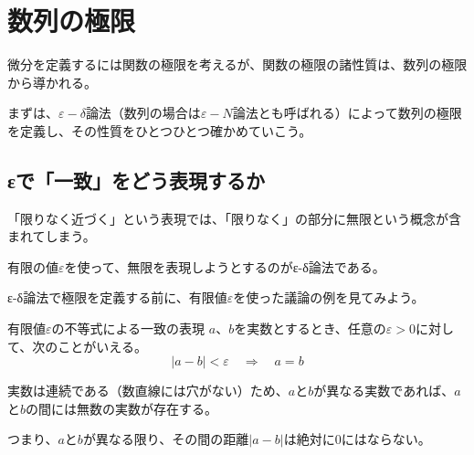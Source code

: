 \documentclass[../../imaging-math]{subfiles}
\begin{document}
\section{数列の極限}

微分を定義するには関数の極限を考えるが、関数の極限の諸性質は、数列の極限から導かれる。

まずは、$\varepsilon - \delta $論法（数列の場合は$\varepsilon - N$論法とも呼ばれる）によって数列の極限を定義し、その性質をひとつひとつ確かめていこう。

\subsection{εで「一致」をどう表現するか}

「限りなく近づく」という表現では、「限りなく」の部分に無限という概念が含まれてしまう。

有限の値$\varepsilon$を使って、無限を表現しようとするのがε-δ論法である。

\froufrou

ε-δ論法で極限を定義する前に、有限値$\varepsilon$を使った議論の例を見てみよう。

\begin{theorem}{有限値$\varepsilon $の不等式による一致の表現}\label{theorem:有限値εの不等式による一致の表現}
  \titlegap
  $a$、$b$を実数とするとき、任意の$\varepsilon >0$に対して、次のことがいえる。
  \LARGE
  \begin{equation}
    |a-b|<\varepsilon \quad \Longrightarrow  \quad a=b
  \end{equation}
\end{theorem}

実数は連続である（数直線には穴がない）ため、$a$と$b$が異なる実数であれば、$a$と$b$の間には無数の実数が存在する。

つまり、$a$と$b$が異なる限り、その間の距離$|a-b|$は絶対に$0$にはならない。
\end{document}
